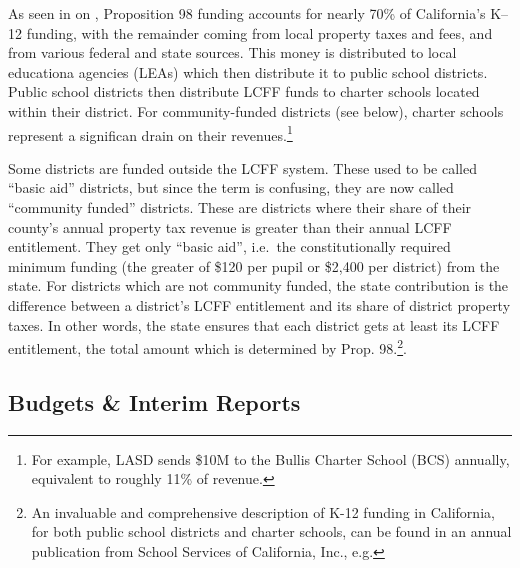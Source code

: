 As seen in  on \pageref{fig:2019–20_K–12_Funding}, Proposition 98 funding accounts for nearly 70\% of California's K–12 funding, with the remainder coming from local property taxes and fees, and from various federal and state sources. This money is distributed to local educationa agencies (LEAs) which then distribute it to public school districts. Public school districts then distribute LCFF funds to charter schools located within their district. For community-funded districts (see below), charter schools represent a significan drain on their revenues.\footnote{For example, LASD sends \$10M to the Bullis Charter School (BCS) annually, equivalent to roughly 11\% of revenue.}

Some districts are funded outside the LCFF system. These used to be called ``basic aid'' districts, but since the term is confusing, they are now called ``community funded'' districts. These are districts where their share of their county's annual property tax revenue is greater than their annual LCFF entitlement. They get only ``basic aid'', i.e.~the constitutionally required minimum funding (the greater of \$120 per pupil or \$2,400 per district) from the state. For districts which are not community funded, the state contribution is the difference between a district's LCFF entitlement and its share of district property taxes. In other words, the state ensures that each district gets at least its LCFF entitlement, the total amount which is determined by Prop. 98.\footnote{An invaluable and comprehensive description of K-12 funding in California, for both public school districts and charter schools, can be found in an annual publication from School Services of California, Inc., e.g. }.

\subsection{Budgets \& Interim Reports}\label{sec:budgets}\indent%


